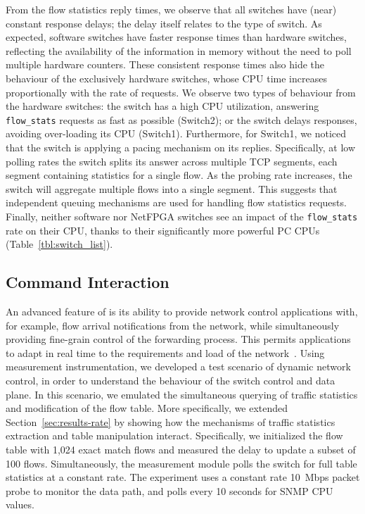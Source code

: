 From the flow statistics reply times, we observe that all switches have
(near) constant response delays; the delay itself relates to the type of switch.
As expected, software switches have faster response times than hardware
switches, reflecting the availability of the information in memory without the
need to poll multiple hardware counters. These consistent response times also
hide the behaviour of the exclusively hardware switches, whose CPU time increases
proportionally with the rate of requests.  We observe two types of behaviour from
the hardware switches: the switch has a high CPU utilization, answering
\texttt{flow\_stats} requests as fast as possible (Switch2); or the switch delays
responses, avoiding over-loading its CPU (Switch1). Furthermore, for Switch1, we
noticed that the switch is applying a pacing mechanism on its replies.
Specifically, at low polling rates the switch splits its answer across multiple
TCP segments, each segment containing statistics for a single flow.  As the
probing rate increases, the switch will aggregate multiple flows into a single
segment. This suggests that independent queuing mechanisms are used for handling
flow statistics requests. Finally, neither software nor NetFPGA switches see an
impact of the \texttt{flow\_stats} rate on their CPU, thanks to their significantly more
powerful PC CPUs (Table~\ref{tbl:switch_list}).

\subsection{\of Command Interaction}\label{sec:results-interactions}


An advanced feature of \of is its ability to provide network
control applications with, for example, flow arrival notifications from the network,
while simultaneously providing fine-grain control of the forwarding process.
This permits applications to adapt in real time to the requirements and load of
the network~. Using \oflops measurement
instrumentation, we developed a test scenario of dynamic network control, in order
to understand the behaviour of the switch control and data plane.  In this
scenario, we emulated the simultaneous querying of traffic statistics and
modification of the flow table.  More specifically, we extended
Section~\ref{sec:results-rate} by showing how the mechanisms of traffic
statistics extraction and table manipulation interact. Specifically, we
initialized the flow table with 1,024 exact match flows and measured the delay to
update a subset of 100 flows.  Simultaneously, the measurement module polls the
switch for full table statistics at a constant rate. The experiment uses a
constant rate 10~Mbps packet probe to monitor the data path, and polls every 10
seconds for SNMP CPU values.

